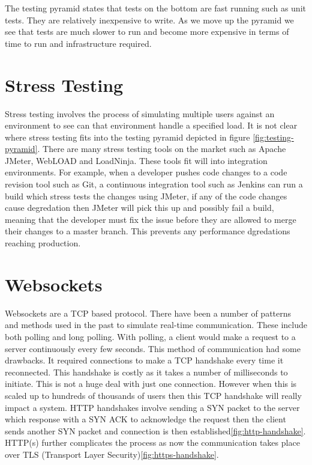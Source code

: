 The testing pyramid states that tests on the bottom are fast running such as unit tests. They are relatively inexpensive to write. As we move up the pyramid we see that tests are much slower to run and become more expensive in terms of time to run and infrastructure required.

\section{Stress Testing}

Stress testing involves the process of simulating multiple users against an environment to see can that environment handle a specified load. It is not clear where stress testing fits into the testing pyramid depicted in figure \ref{fig:testing-pyramid}. There are many stress testing tools on the market such as Apache JMeter, WebLOAD and LoadNinja. These tools fit will into integration environments. For example, when a developer pushes code changes to a code revision tool such as Git, a continuous integration tool such as Jenkins can run a build which stress tests the changes using JMeter, if any of the code changes cause degredation then JMeter will pick this up and possibly fail a build, meaning that the developer must fix the issue before they are allowed to merge their changes to a master branch. This prevents any performance dgredations reaching production.

\section{Websockets}

Websockets are a TCP based protocol\cite{8089962}. There have been a number of patterns and methods used in the past to simulate real-time communication. These include both polling and long polling. With polling, a client would make a request to a server continuously every few seconds. This method of communication had some drawbacks. It required connections to make a TCP handshake every time it reconnected. This handshake is costly as it takes a number of milliseconds to initiate. This is not a huge deal with just one connection. However when this is scaled up to hundreds of thousands of users then this TCP handshake will really impact a system\cite{5735801}. HTTP handshakes involve sending a SYN packet to the server which response with a SYN ACK to acknowledge the request then the client sends another SYN packet and connection is then established\ref{fig:http-handshake}\cite{5735801}. HTTP(s) further complicates the process as now the communication takes place over TLS (Transport Layer Security)\ref{fig:https-handshake}. 


